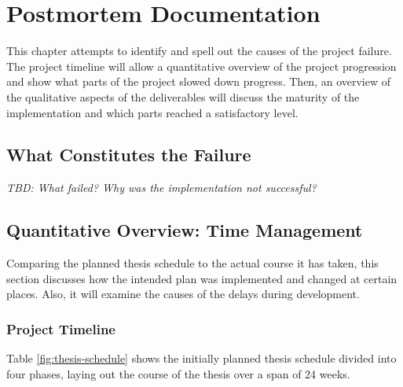 \chapter{Postmortem Documentation}
\label{chap:postmortem}
This chapter attempts to identify and spell out the causes of the project failure. The project timeline will allow a quantitative overview of the project progression and show what parts of the project slowed down progress. Then, an overview of the qualitative aspects of the deliverables will discuss the maturity of the implementation and which parts reached a satisfactory level.

\section{What Constitutes the Failure}
\emph{TBD: What failed? Why was the implementation not successful?}

\section{Quantitative Overview: Time Management}
\label{sec:pm-time-management}
Comparing the planned thesis schedule to the actual course it has taken, this section discusses how the intended plan was implemented and changed at certain places. Also, it will examine the causes of the delays during development.
\subsection{Project Timeline}
\label{sec:project-timeline}
Table \ref{fig:thesis-schedule} shows the initially planned thesis schedule divided into four phases, laying out the course of the thesis over a span of 24 weeks.

